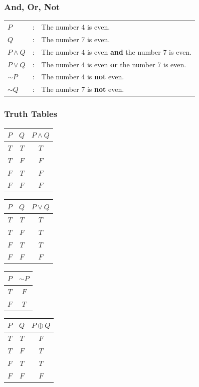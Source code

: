 \documentclass{beamer}
\renewcommand{\neg}{\sim}
\newcommand{\xor}{\oplus}
\newcommand{\bfr}[1]{\begin{frame}[fragile]\frametitle{{ #1 }}}
\begin{document}
\bfr{And, Or, Not}
\begin{tabular}{lll}
  $P$&: & The number 4 is even.\\
  $Q$&: & The number 7 is even.\\
  $P\wedge Q$&: & The number 4 is even {\bf and} the number 7 is even.\\
  $P\vee Q$&:& The number 4 is even {\bf or} the number 7 is even.\\
  $\neg P$&:& The number 4 is {\bf not} even.\\
  $\neg Q$&:& The number 7 is {\bf not} even.\\
\end{tabular}
\end{frame}

\bfr{Truth Tables}
\begin{tabular}{|c|c|c|}\hline
  $P$ & $Q$ & $P\land Q$ \\\hline
  $T$ & $T$ & $T$ \\\hline
  $T$ & $F$ & $F$ \\\hline
  $F$ & $T$ & $F$ \\\hline
  $F$ & $F$ & $F$ \\\hline
\end{tabular}\hfill
\begin{tabular}{|c|c|c|}\hline
  $P$ & $Q$ & $P\lor Q$ \\\hline
  $T$ & $T$ & $T$ \\\hline
  $T$ & $F$ & $T$ \\\hline
  $F$ & $T$ & $T$ \\\hline
  $F$ & $F$ & $F$ \\\hline
\end{tabular}

\vfill

\begin{tabular}{|c|c|}\hline
  $P$ & $\neg P$ \\\hline
  $T$ & $F$ \\\hline
  $F$ & $T$ \\\hline
\end{tabular}\hfill
\begin{tabular}{|c|c|c|}\hline
  $P$ & $Q$ & $P\xor Q$ \\\hline
  $T$ & $T$ & $F$ \\\hline
  $T$ & $F$ & $T$ \\\hline
  $F$ & $T$ & $T$ \\\hline
  $F$ & $F$ & $F$ \\\hline
\end{tabular}\hfill
\end{frame}
\end{document}
